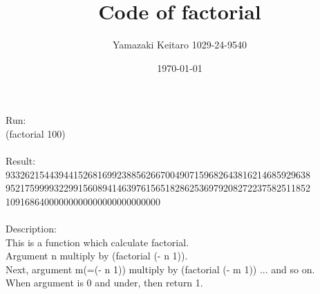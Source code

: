 ﻿\documentclass[a4paper,12pt]{article}
\begin{document}
\title{Code of factorial}
\author{Yamazaki Keitaro 1029-24-9540}
\date{\today}
\maketitle

\lstset{numbers=left,basicstyle=\small}


{\large Run:}\\
  (factorial 100)\\
\\
{\large Result:}\\
  933262154439441526816992388562667004907159682643816214685929638\\
  952175999932299156089414639761565182862536979208272237582511852\\
  10916864000000000000000000000000\\
\\
{\large Description:}\\
  This is a function which calculate factorial.\\
  Argument n multiply by (factorial (- n 1)).\\
  Next, argument m(=(- n 1)) multiply by (factorial (- m 1)) ... and so on.\\
  When argument is 0 and under, then return 1.\\
\\
\end{document}
